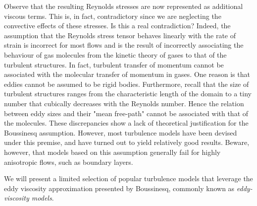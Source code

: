 Observe that the resulting Reynolds stresses are now represented as additional viscous terms. This is, in fact, contradictory since we are neglecting the convective effects of these stresses. Is this a real contradiction?  Indeed, the assumption that the Reynolds stress tensor behaves linearly with the rate of strain is incorrect for most flows and is the result of incorrectly associating the behaviour of gas molecules from the kinetic theory of gases to that of the turbulent structures. In fact, turbulent transfer of momentum cannot be associated with the molecular transfer of momentum in gases. One reason is that eddies cannot be assumed to be rigid bodies. Furthermore, recall that the size of turbulent structures ranges from the characteristic length of the domain to a tiny number that cubically decreases with the Reynolds number. Hence the relation between eddy sizes and their "mean free-path" cannot be associated with that of the molecules. These discrepancies show a lack of theoretical justification for the Boussinesq assumption. However, most turbulence models have been devised under this premise, and have turned out to yield relatively good results. Beware, however, that models based on this assumption generally fail for highly anisotropic flows, such as boundary layers.

We will present a limited selection of popular turbulence models that leverage the eddy viscosity approximation presented by Boussinesq, commonly known as \textit{eddy-viscosity models}.

